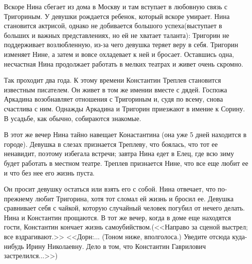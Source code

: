 \documentclass[a4paper,12pt]{article}
\begin{document}
	Вскоре Нина сбегает из дома в Москву и там вступает в любовную связь с Тригориным. У девушки рождается ребенок, который вскоре умирает. Нина становится актрисой, однако не добивается большого успеха(выступает в больших и важных представлениях, но ей не хватает таланта): Тригорин не поддерживает возлюбленную, из-за чего девушка теряет веру в себя. Тригорин изменяет Нине, а затем и вовсе охладевает к ней и бросает. Оставшись одна, несчастная Нина продолжает работать в мелких театрах и живет очень скромно.
	
	Так проходит два года. К этому времени Константин Треплев становится известным писателем. Он живет в том же имении вместе с дядей. Госпожа Аркадина возобнавляет отношения с Тригориным и, судя по всему, снова счастлива с ним. Однажды Аркадина и Тригорин приезжают в имение к Сорину. В усадьбе, как обычно, собираются знакомые.
	
	В этот же вечер Нина тайно навещает Конастантина (она уже 5 дней находится в городе). Девушка в слезах признается Треплеву, что боялась, что тот ее ненавидит, поэтому избегала встречи; завтра Нина едет в Елец, где всю зиму будет работать в местном театре. Треплев признается Нине, что все еще любит ее и что без нее его жизнь пуста.
	
	Он просит девушку остаться или взять его с собой. Нина отвечает, что по-прежнему любит Тригорина, хотя тот сломал ей жизнь и бросил ее. Девушка сравнивает себя с чайкой, которую случайный человек погубил от нечего делать. Нина и Константин прощаются. В тот же вечер, когда в доме еще находятся гости, Константин кончает жизнь самоубийством.(<<Направо за сценой выстрел; все вздрагивают.>> <<Дорн:... (Тоном ниже, вполголоса.) Уведите отсюда куда-нибудь Ирину Николаевну. Дело в том, что Константин Гаврилович застрелился...>>)
	
	
\end{document}
